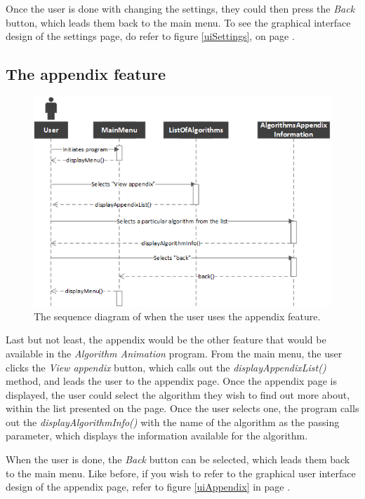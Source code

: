 Once the user is done with changing the settings, they could then press the \textit{Back} button, which leads them back to the main menu. To see the graphical interface design of the settings page, do refer to figure \ref{uiSettings}, on page \pageref{uiSettings}.

\newpage

\subsection{The appendix feature}

\begin{figure}[H]
\centering
\includegraphics[scale=1]{images/report_images/sequenceDiagramAppendix.png}
\caption{The sequence diagram of when the user uses the appendix feature.}
\label{sequenceDiagramAppendix}
\end{figure}

Last but not least, the appendix would be the other feature that would be available in the \textit{Algorithm Animation} program. From the main menu, the user clicks the \textit{View appendix} button, which calls out the \textit{displayAppendixList()} method, and leads the user to the appendix page. Once the appendix page is displayed, the user could select the algorithm they wish to find out more about, within the list presented on the page. Once the user selects one, the program calls out the \textit{displayAlgorithmInfo()} with the name of the algorithm as the passing parameter, which displays the information available for the algorithm.

When the user is done, the \textit{Back} button can be selected, which leads them back to the main menu. Like before, if you wish to refer to the graphical user interface design of the appendix page, refer to figure \ref{uiAppendix} in page \pageref{uiAppendix}.

